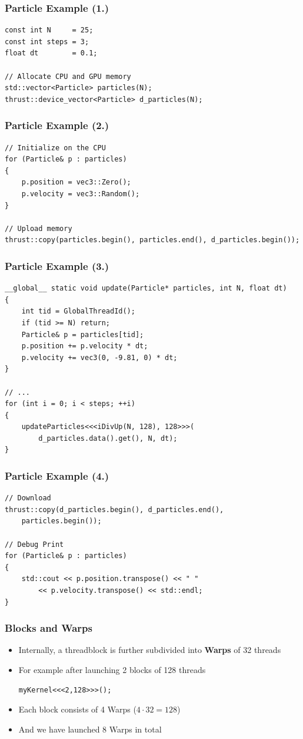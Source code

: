 \documentclass[aspectratio=169]{beamer}
\begin{document}
\begin{frame}[fragile]
\frametitle{Particle Example (1.)}
\begin{lstlisting}
const int N     = 25;
const int steps = 3;
float dt        = 0.1;

// Allocate CPU and GPU memory
std::vector<Particle> particles(N);
thrust::device_vector<Particle> d_particles(N);
\end{lstlisting}
\end{frame}

\begin{frame}[fragile]
\frametitle{Particle Example (2.)}
\begin{lstlisting}
// Initialize on the CPU
for (Particle& p : particles)
{
    p.position = vec3::Zero();
    p.velocity = vec3::Random();
}

// Upload memory
thrust::copy(particles.begin(), particles.end(), d_particles.begin());
\end{lstlisting}
\end{frame}

\begin{frame}[fragile]
\frametitle{Particle Example (3.)}
\begin{lstlisting}
__global__ static void update(Particle* particles, int N, float dt)
{
    int tid = GlobalThreadId();
    if (tid >= N) return;
    Particle& p = particles[tid];
    p.position += p.velocity * dt;
    p.velocity += vec3(0, -9.81, 0) * dt;
}

// ...
for (int i = 0; i < steps; ++i)
{
    updateParticles<<<iDivUp(N, 128), 128>>>(
    	d_particles.data().get(), N, dt);
}
\end{lstlisting}
\end{frame}

\begin{frame}[fragile]
\frametitle{Particle Example (4.)}
\begin{lstlisting}
// Download
thrust::copy(d_particles.begin(), d_particles.end(), 
	particles.begin());

// Debug Print
for (Particle& p : particles)
{
    std::cout << p.position.transpose() << " " 
    	<< p.velocity.transpose() << std::endl;
}
\end{lstlisting}
\end{frame}

\begin{frame}[fragile]
	\frametitle{Blocks and Warps}
\begin{itemize}
\item Internally, a threadblock is further subdivided into \textbf{Warps} of 32 threads
\item For example after launching 2 blocks of 128 threads
\begin{lstlisting}
myKernel<<<2,128>>>();
\end{lstlisting}
\item Each block consists of 4 Warps ($4\cdot 32 = 128$)
\item And we have launched 8 Warps in total
\end{itemize}
\end{frame}
\end{document}
